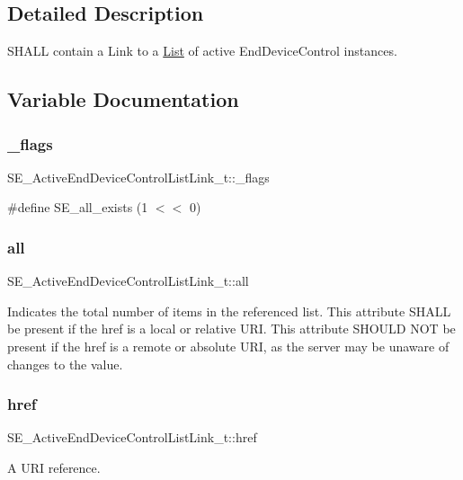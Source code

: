 \subsection{Detailed Description}
S\+H\+A\+LL contain a Link to a \hyperlink{structList}{List} of active End\+Device\+Control instances. 

\subsection{Variable Documentation}
\mbox{\label{group__ActiveEndDeviceControlListLink_gad2890eef1f191fbfa7bc7986e8c43b0a}} 
\subsubsection{\texorpdfstring{\+\_\+flags}{\_flags}}
{\footnotesize\ttfamily S\+E\+\_\+\+Active\+End\+Device\+Control\+List\+Link\+\_\+t\+::\+\_\+flags}

\#define S\+E\+\_\+all\+\_\+exists (1 $<$$<$ 0) \mbox{\label{group__ActiveEndDeviceControlListLink_ga2db41b3930721cb02927b5472619b213}} 
\subsubsection{\texorpdfstring{all}{all}}
{\footnotesize\ttfamily S\+E\+\_\+\+Active\+End\+Device\+Control\+List\+Link\+\_\+t\+::all}

Indicates the total number of items in the referenced list. This attribute S\+H\+A\+LL be present if the href is a local or relative U\+RI. This attribute S\+H\+O\+U\+LD N\+OT be present if the href is a remote or absolute U\+RI, as the server may be unaware of changes to the value. \mbox{\label{group__ActiveEndDeviceControlListLink_ga638f47411afef0238c82266ba67860d5}} 
\subsubsection{\texorpdfstring{href}{href}}
{\footnotesize\ttfamily S\+E\+\_\+\+Active\+End\+Device\+Control\+List\+Link\+\_\+t\+::href}

A U\+RI reference. 